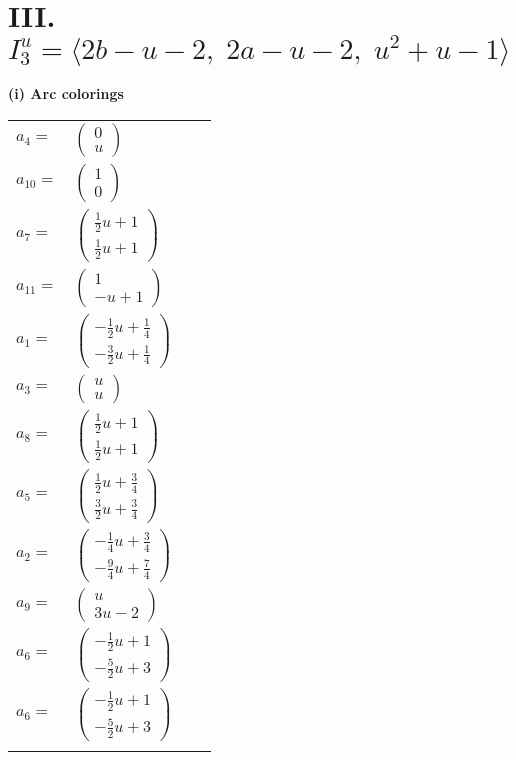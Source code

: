 \documentclass[1p]{elsarticle_modified}
\theoremstyle{definition}
\begin{document}
\centering \section*{III. $I^u_{3}= \langle 2 b- u-2,\;2 a- u-2,\;u^2+u-1 \rangle$}
\flushleft \textbf{(i) Arc colorings}\\
\begin{tabular}{m{7pt} m{180pt} m{7pt} m{180pt} }
\flushright $a_{4}=$&$\begin{pmatrix}0\\u\end{pmatrix}$ \\
\flushright $a_{10}=$&$\begin{pmatrix}1\\0\end{pmatrix}$ \\
\flushright $a_{7}=$&$\begin{pmatrix}\frac{1}{2} u+1\\\frac{1}{2} u+1\end{pmatrix}$ \\
\flushright $a_{11}=$&$\begin{pmatrix}1\\- u+1\end{pmatrix}$ \\
\flushright $a_{1}=$&$\begin{pmatrix}-\frac{1}{2} u+\frac{1}{4}\\-\frac{3}{2} u+\frac{1}{4}\end{pmatrix}$ \\
\flushright $a_{3}=$&$\begin{pmatrix}u\\u\end{pmatrix}$ \\
\flushright $a_{8}=$&$\begin{pmatrix}\frac{1}{2} u+1\\\frac{1}{2} u+1\end{pmatrix}$ \\
\flushright $a_{5}=$&$\begin{pmatrix}\frac{1}{2} u+\frac{3}{4}\\\frac{3}{2} u+\frac{3}{4}\end{pmatrix}$ \\
\flushright $a_{2}=$&$\begin{pmatrix}-\frac{1}{4} u+\frac{3}{4}\\-\frac{9}{4} u+\frac{7}{4}\end{pmatrix}$ \\
\flushright $a_{9}=$&$\begin{pmatrix}u\\3 u-2\end{pmatrix}$ \\
\flushright $a_{6}=$&$\begin{pmatrix}-\frac{1}{2} u+1\\-\frac{5}{2} u+3\end{pmatrix}$\\ \flushright $a_{6}=$&$\begin{pmatrix}-\frac{1}{2} u+1\\-\frac{5}{2} u+3\end{pmatrix}$\\&\end{tabular}
\end{document}
